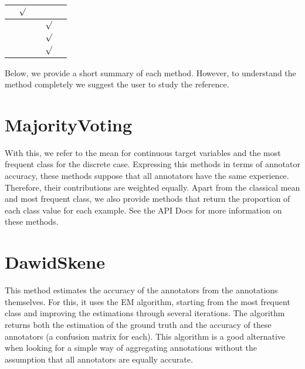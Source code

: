 \documentclass[letterpaper,10pt,english]{sphinxmanual}
\begin{document}
\begin{savenotes}
\begin{tabulary}{\linewidth}[t]{|T|T|T|T|T|}
&
\(\surd\)
&
\\
\hline
{}
&&&
\(\surd\)
&
\\
\hline
{}
&&&
\(\surd\)
&
\\
\hline
{}
&&&
\(\surd\)
&
\\
\hline
\end{tabulary}
\par
\sphinxattableend\end{savenotes}

Below, we provide a short summary of each method. However, to understand the method completely we suggest the
user to study the reference.


\section{MajorityVoting}
\label{\detokenize{package/methods:id2}}
With this, we refer to the mean for continuous target variables and the most frequent class for the discrete
case. Expressing this methods in terms of annotator accuracy, these methods suppose that all annotators have
the same experience. Therefore, their contributions are weighted equally. Apart from the classical mean and
most frequent class, we also provide methods that return the proportion of each class value for each example.
See the API Docs for more information on these methods.


\section{DawidSkene}
\label{\detokenize{package/methods:id3}}
This method estimates the accuracy of the annotators from the annotations themselves. For this, it uses the EM
algorithm, starting from the most frequent class and improving the estimations through several iterations. The
algorithm returns both the estimation of the ground truth and the accuracy of these annotators (a confusion
matrix for each). This algorithm is a good alternative when looking for a simple way of aggregating annotations
without the assumption that all annotators are equally accurate.
\end{document}
